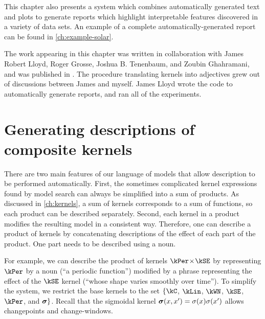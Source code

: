 This chapter also presents a system which combines automatically generated text and plots to generate reports which highlight interpretable features discovered in a variety of data sets.
An example of a complete automatically-generated report can be found in \cref{ch:example-solar}.

The work appearing in this chapter was written in collaboration with James Robert Lloyd, Roger Grosse, Joshua B. Tenenbaum, and Zoubin Ghahramani, and was published in \citet{LloDuvGroetal14}.
The procedure translating kernels into adjectives grew out of discussions between James and myself.
James Lloyd wrote the code to automatically generate reports, and ran all of the experiments.


\section{Generating descriptions of composite kernels}

There are two main features of our language of \gp{} models that allow description to be performed automatically.
First, the sometimes complicated kernel expressions found by model search can always be simplified into a sum of products.
As discussed in \cref{ch:kernels}, a sum of kernels corresponds to a sum of functions, so each product can be described separately.
Second, each kernel in a product modifies the resulting model in a consistent way.
Therefore, one can describe a product of kernels by concatenating descriptions of the effect of each part of the product.
One part needs to be described using a noun.

For example, we can describe the product of kernels $\kPer \kerntimes \kSE$ by representing $\kPer$ by a noun (``a periodic function'') modified by a phrase representing the effect of the $\kSE$ kernel (``whose shape varies smoothly over time'').
To simplify the system, we restrict the base kernels to the set $\{\kC$, $\kLin$, $\kWN$, $\kSE$, $\kPer$, and ${\boldsymbol{\sigma}}\}$.
Recall that the sigmoidal kernel ${\boldsymbol{\sigma}}(x, x') = \sigma(x)\sigma(x')$ allows changepoints and change-windows.


